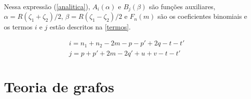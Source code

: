 Nessa expressão (\autoref{analitica}), $A_i (\alpha)$ e $B_j (\beta)$ são funções auxiliares, $\alpha = R(\zeta_1 + \zeta_2)/2$, $\beta = R(\zeta_1 - \zeta_2)/2$ e $F_n(m)$ são os coeficientes binomiais \autocite{Mekelleche1997} e os termos $i$ e $j$ estão descritos na \autoref{termos}.

\begin{align}
\label{termos}
    i = n_1 + n_2 - 2m - p - p' + 2q - t - t' \\
    j = p + p' + 2m - 2q' + u + v - t - t'
\end{align}







\section{Teoria de grafos}

